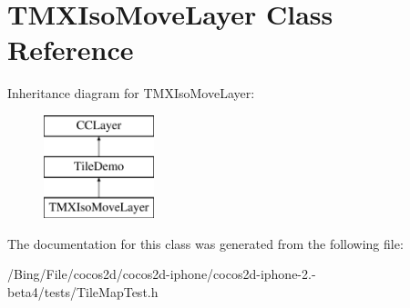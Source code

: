 \hypertarget{interface_t_m_x_iso_move_layer}{\section{T\-M\-X\-Iso\-Move\-Layer Class Reference}
\label{interface_t_m_x_iso_move_layer}
}
Inheritance diagram for T\-M\-X\-Iso\-Move\-Layer\-:\begin{figure}[H]
\begin{center}
\leavevmode
\includegraphics[height=3.000000cm]{interface_t_m_x_iso_move_layer}
\end{center}
\end{figure}


The documentation for this class was generated from the following file\-:\begin{DoxyCompactItemize}
\item 
/\-Bing/\-File/cocos2d/cocos2d-\/iphone/cocos2d-\/iphone-\/2.-\/beta4/tests/Tile\-Map\-Test.\-h\end{DoxyCompactItemize}
